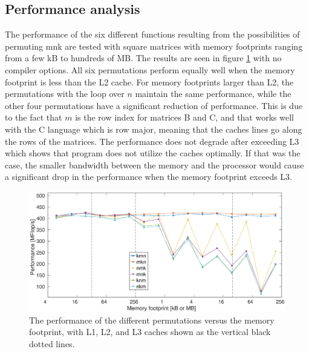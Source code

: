 \subsection{Performance analysis}
The performance of the six different functions resulting from the possibilities of permuting mnk are tested with square matrices with memory footprints ranging from a few kB to hundreds of MB. The results are seen in figure \ref{fig:permGraph_none} with no compiler options. All six permutations perform equally well when the memory footprint is less than the L2 cache. For memory footprints larger than L2, the permutations with the loop over $n$ maintain the same performance, while the other four permutations have a significant reduction of performance. This is due to the fact that $m$ is the row index for matrices B and C, and that works well with the C language which is row major, meaning that the caches lines go along the rows of the matrices. The performance does not degrade after exceeding L3 which shows that program does not utilize the caches optimally. If that was the case, the smaller bandwidth between the memory and the processor would cause a significant drop in the performance when the memory footprint exceeds L3.
\begin{figure}
\centering
\includegraphics[width = 1.1\textwidth]{fig/permGraph_none.eps}
\caption{The performance of the different permutations versus the memory footprint, with L1, L2, and L3 caches shown as the vertical black dotted lines.}
\label{fig:permGraph_none}
\end{figure}
